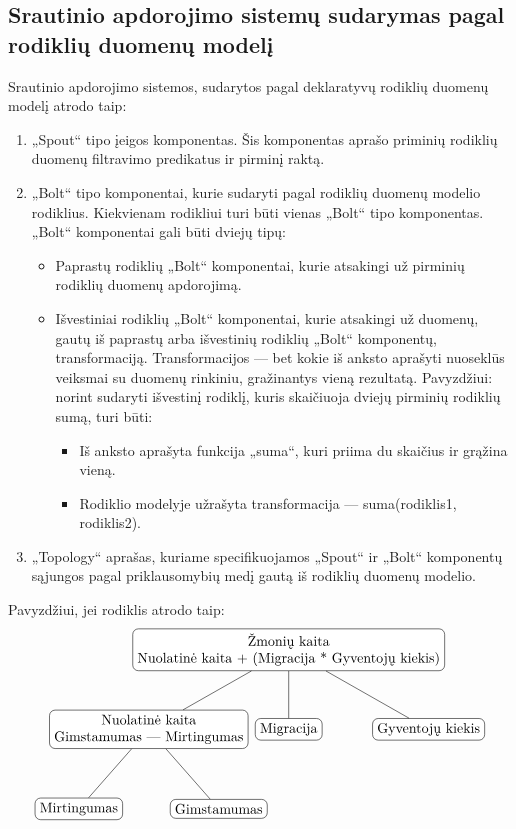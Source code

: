 \documentclass{VUMIFPSbakalaurinis}
\begin{document}
\subsection{Srautinio apdorojimo sistemų sudarymas pagal rodiklių duomenų modelį}
Srautinio apdorojimo sistemos, sudarytos pagal deklaratyvų rodiklių duomenų modelį atrodo taip:
\begin{enumerate}
    \item „Spout“ tipo įeigos komponentas. Šis komponentas aprašo priminių rodiklių duomenų filtravimo predikatus ir pirminį raktą. 
    \item „Bolt“ tipo komponentai, kurie sudaryti pagal rodiklių duomenų modelio rodiklius. Kiekvienam rodikliui turi būti vienas „Bolt“ tipo komponentas. „Bolt“ komponentai gali būti dviejų tipų:
    \begin{itemize}
        \item Paprastų rodiklių „Bolt“ komponentai, kurie atsakingi už pirminių rodiklių duomenų apdorojimą.
        \item Išvestiniai rodiklių „Bolt“ komponentai, kurie atsakingi už duomenų, gautų iš paprastų arba išvestinių rodiklių „Bolt“ komponentų, transformaciją. Transformacijos — bet kokie iš anksto aprašyti nuoseklūs veiksmai su duomenų rinkiniu, gražinantys vieną rezultatą. Pavyzdžiui: norint sudaryti išvestinį rodiklį, kuris skaičiuoja dviejų pirminių rodiklių sumą, turi būti:
        \begin{itemize}
            \item Iš anksto aprašyta funkcija „suma“, kuri priima du skaičius ir grąžina vieną.
            \item Rodiklio modelyje užrašyta transformacija — suma(rodiklis1, rodiklis2).
        \end{itemize} 
    \end{itemize}
    \item „Topology“ aprašas, kuriame specifikuojamos „Spout“ ir „Bolt“ komponentų sąjungos pagal priklausomybių medį gautą iš rodiklių duomenų modelio.
\end{enumerate}\par
Pavyzdžiui, jei rodiklis atrodo taip:     
\[
    \begin{tikzpicture}[sibling distance=10em,
        level distance=2cm,
        every node/.style = {shape=rectangle, rounded corners,	
                             draw, align=center,	
                             top color=white, bottom color=white}]	
        \node{Žmonių kaita\\Nuolatinė kaita + (Migracija * Gyventojų kiekis)}
                child { node {Nuolatinė kaita\\Gimstamumas — Mirtingumas} 
                        child {node {Mirtingumas}}
                        child {node {Gimstamumas}} }	
                child { node {Migracija} } 	
                child { node {Gyventojų kiekis} }; 	
    \end{tikzpicture} 	
\]\par
\end{document}
